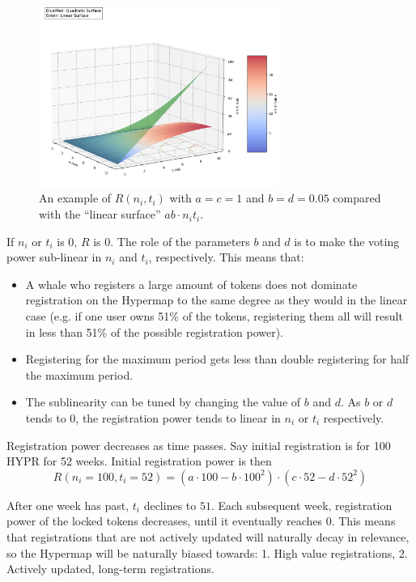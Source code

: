 \documentclass{article}
\begin{document}
\begin{figure}[h]
    \centering
    \includegraphics[width=0.7\textwidth]{voting-power-surface.png}
    \caption{An example of $R(n_i, t_i)$ with $a = c = 1$ and $b = d = 0.05$ compared with the ``linear surface'' $ab \cdot n_it_i$.}
    \label{fig:example-image}
\end{figure}


If $n_i$ or $t_i$ is $0$, $R$ is $0$.
The role of the parameters $b$ and $d$ is to make the voting power sub-linear in $n_i$ and $t_i$, respectively.
This means that:
\begin{itemize}
    \item A whale who registers a large amount of tokens does not dominate registration on the Hypermap to the same degree as they would in the linear case (e.g. if one user owns 51\% of the tokens, registering them all will result in less than 51\% of the possible registration power).
    \item Registering for the maximum period gets less than double registering for half the maximum period.
    \item The sublinearity can be tuned by changing the value of $b$ and $d$.
      As $b$ or $d$ tends to $0$, the registration power tends to linear in $n_i$ or $t_i$ respectively.
\end{itemize}

Registration power decreases as time passes.
Say initial registration is for 100 HYPR for 52 weeks.
Initial registration power is then
\begin{equation}
R(n_i=100, t_i=52) = (a\cdot 100 - b\cdot 100^2) \cdot (c\cdot 52 - d\cdot 52^2)
\end{equation}

After one week has past, $t_i$ declines to $51$.
Each subsequent week, registration power of the locked tokens decreases, until it eventually reaches $0$.
This means that registrations that are not actively updated will naturally decay in relevance, so the Hypermap will be naturally biased towards:
1. High value registrations,
2. Actively updated, long-term registrations.
\end{document}
